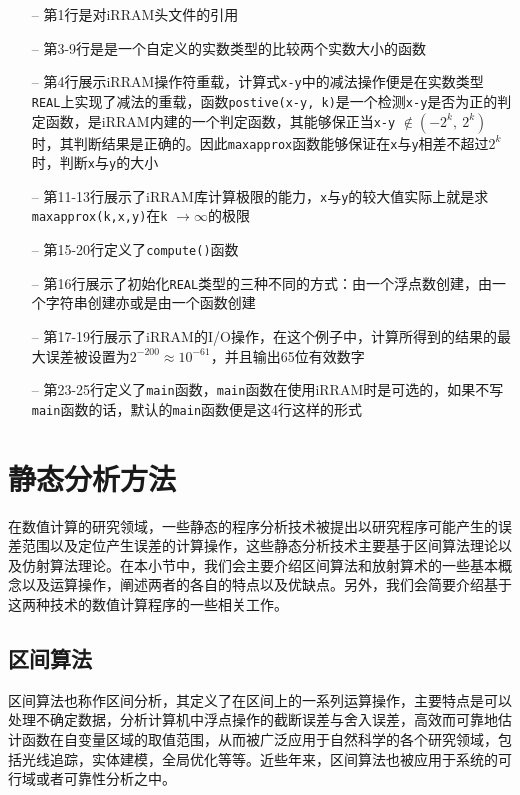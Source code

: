 \begin{itemize}
    \item[--] 第1行是对iRRAM头文件的引用
    \item[--] 第3-9行是是一个自定义的实数类型的比较两个实数大小的函数
    \item[--] 第4行展示iRRAM操作符重载，计算式\texttt{x-y}中的减法操作便是在实数类型\texttt{REAL}上实现了减法的重载，函数\texttt{postive(x-y, k)}是一个检测\texttt{x-y}是否为正的判定函数，是iRRAM内建的一个判定函数，其能够保正当\texttt{x-y} $\notin (-2^{k},\ 2^k)$时，其判断结果是正确的。因此\texttt{maxapprox}函数能够保证在\texttt{x}与\texttt{y}相差不超过$2^k$时，判断\texttt{x}与\texttt{y}的大小
    \item[--] 第11-13行展示了iRRAM库计算极限的能力，\texttt{x}与\texttt{y}的较大值实际上就是求\texttt{maxapprox(k,x,y)}在\texttt{k} $\rightarrow \infty$的极限
    \item[--] 第15-20行定义了\texttt{compute()}函数
    \item[--] 第16行展示了初始化\texttt{REAL}类型的三种不同的方式：由一个浮点数创建，由一个字符串创建亦或是由一个函数创建
    \item[--] 第17-19行展示了iRRAM的I/O操作，在这个例子中，计算所得到的结果的最大误差被设置为$2^{-200} \approx 10^{-61}$，并且输出65位有效数字
    \item[--] 第23-25行定义了\texttt{main}函数，\texttt{main}函数在使用iRRAM时是可选的，如果不写\texttt{main}函数的话，默认的\texttt{main}函数便是这4行这样的形式
\end{itemize}


\section{静态分析方法}
在数值计算的研究领域，一些静态的程序分析技术被提出以研究程序可能产生的误差范围以及定位产生误差的计算操作，这些静态分析技术主要基于区间算法理论以及仿射算法理论。在本小节中，我们会主要介绍区间算法和放射算术的一些基本概念以及运算操作，阐述两者的各自的特点以及优缺点。另外，我们会简要介绍基于这两种技术的数值计算程序的一些相关工作。

\subsection{区间算法}

区间算法\cite{moore1979methods}\cite{moore2009introduction}也称作区间分析，其定义了在区间上的一系列运算操作，主要特点是可以处理不确定数据，分析计算机中浮点操作的截断误差与舍入误差，高效而可靠地估计函数在自变量区域的取值范围，从而被广泛应用于自然科学的各个研究领域，包括光线追踪，实体建模，全局优化等等。近些年来，区间算法也被应用于系统的可行域或者可靠性分析\cite{cheng2015global}之中。

